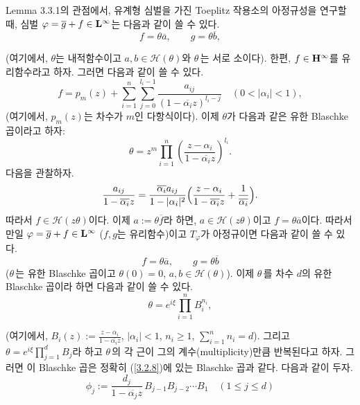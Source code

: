 \documentclass[12pt,a4paper,2sided]{article}
\newcommand{\vs}{\vspace}
\begin{document}
\vs{0.2cm} Lemma 3.3.1의 관점에서, 유계형 심벌을 가진 Toeplitz
작용소의 아정규성을 연구할 때, 심벌 $\varphi= \overline{g}+ f \in
\bold L^{\infty}$는 다음과 같이 쓸 수 있다.
\begin{equation}\label{3.2.7}
f=\theta \overline{a},\quad \quad g=\theta \overline{b},
\end{equation}

\newpage{}

 \vspace{.8 cm} \noindent (여기에서, $\theta$는
내적함수이고 $a,b \in \mathcal H (\theta)$와 $\theta$\,는 서로
소이다). 한편, $f \in \bold H^{\infty}$를 유리함수라고 하자. 그러면
다음과 같이 쓸 수 있다.
$$
f=p_m(z)+\sum_{i=1}^n \sum_{j=0}^{l_i -1}
\frac{a_{ij}}{(1-\overline{\alpha_i}z)^{l_i -j}} \quad
(0<|\alpha_i|<1),
$$
(여기에서, $p_m(z)$는 차수가 $m$인 다항식이다). 이제 $\theta$가
다음과 같은 유한 Blaschke 곱이라고 하자:
$$
\theta=z^{m} \prod_{i=1}^{n} \left(\frac{z- \alpha_i}{1- \overline{\alpha_i}z}\right)^{l_i}.
$$
다음을 관찰하자.
$$
\frac{a_{ij}}{1-\overline{\alpha_i}z}=
\frac{\overline{\alpha_i}a_{ij}}{1 - |\alpha_i|^2}
\Bigl(\frac{z-\alpha_i}{1- \overline{\alpha_i}z}
+\frac{1}{\overline{\alpha_i}} \Bigr).
$$
따라서 $f \in \mathcal H (z\theta)$이다. 이제 $a := \theta
\overline{f}$라 하면, $a \in \mathcal H (z \theta)$이고  $f= \theta
\overline{a}$이다. 따라서 만일 $\varphi = \overline{g} + f \in \bold
L^{\infty}$ ($f,g$는 유리함수)이고 $T_{\varphi}$가 아정규이면 다음과
같이 쓸 수 있다.
$$
f=\theta \overline{a},\quad\quad g=\theta \overline{b}
$$
($\theta$\,는 유한 Blaschke 곱이고 $\theta (0)=0$, $a,b \in \mathcal
H (\theta)$). 이제 $\theta$\,를 차수 $d$\;의 유한 Blaschke 곱이라
하면 다음과 같이 쓸 수 있다.
\begin{equation}\label{3.2.8}
\theta = e^{i \xi} \prod_{i=1}^n B_i ^{n_i},
\end{equation}

\noindent (여기에서, $B_i(z) := \frac{z- \alpha_i}{1-
\overline{\alpha_i}z}$, $|\alpha_i| < 1$, $n_i \geq 1$,
$\sum_{i=1}^n n_i =d$). 그리고 $\theta =e^{i\xi} \prod_{j=1}^d B_j
$라 하고 $\theta$\,의 각 근이 그의 계수(multiplicity)만큼 반복된다고
하자. 그러면 이 Blaschke 곱은 정확히 (\ref{3.2.8})에 있는 Blaschke
곱과 같다. 다음과 같이 두자.
\begin{equation}\label{3.2.9}
\phi_j :=\frac{d_j}{1- \overline{\alpha_j}z}\,B_{j-1}B_{j-2} \cdots
B_1 \quad (1 \leq j \leq d)
\end{equation}
\end{document}
